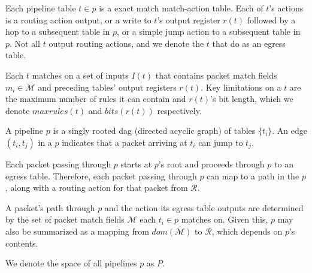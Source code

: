 
 Each pipeline table $t \in p$ is a exact match match-action table. Each of $t$'s actions is a routing action output, or a write to $t$'s output register $r(t)$ followed by a hop to a subsequent table in $p$, or a simple jump action to a subsequent table in $p$. Not all $t$ output routing actions, and we denote the $t$ that do as an egress table.

Each $t$ matches on a set of inputs $I(t)$ that contains packet match fields $m_i \in \mathcal{M}$ and preceding tables' output registers $r(t)$. Key limitations on a $t$ are the maximum number of rules it can contain and $r(t)$'s bit length, which we denote $maxrules(t)$ and $bits(r(t))$ respectively.

 A pipeline $p$ is a singly rooted dag (directed acyclic graph) of tables $\{t_i\}$. An edge $(t_i, t_j)$ in a $p$ indicates that a packet arriving at $t_i$ can jump to $t_j$. 


Each packet passing through $p$ starts at $p$'s root and proceeds through $p$ to an egress table. Therefore, each packet passing through $p$ can map to a path in the $p$, along with a routing action for that packet from $\mathcal{R}$. 

A packet's path through $p$ and the action its egress table outputs are determined by the set of packet match fields $\mathcal{M}$ each $t_i \in p$ matches on. Given this, $p$ may also be summarized as a mapping from $dom(\mathcal{M})$ to $\mathcal{R}$, which depends on $p$'s contents.

We denote the space of all pipelines $p$ as $P$.




